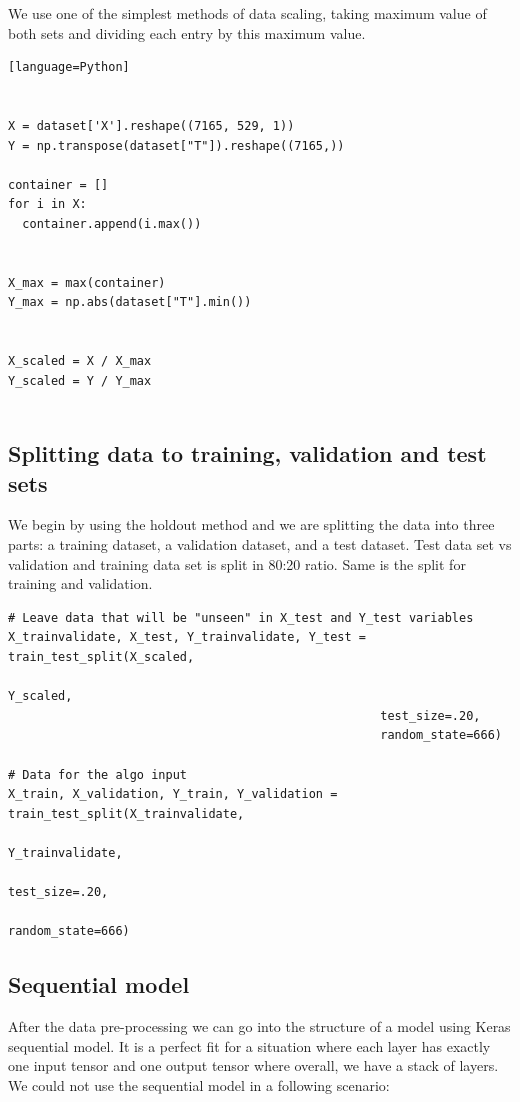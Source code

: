 \documentclass[a4paper,oneside,openright,11pt]{book}
\begin{document}
We use one of the simplest methods of data scaling, taking maximum value of both sets and dividing each entry by this maximum value.

\begin{verbatim}[language=Python]


X = dataset['X'].reshape((7165, 529, 1)) 
Y = np.transpose(dataset["T"]).reshape((7165,))

container = []
for i in X:
  container.append(i.max())
  

X_max = max(container)
Y_max = np.abs(dataset["T"].min())


X_scaled = X / X_max
Y_scaled = Y / Y_max


\end{verbatim}

\subsection{Splitting data to training, validation and test sets}

We begin by using the holdout method and we are splitting the data into three parts: a training dataset, a validation dataset, and a test dataset. Test data set vs validation and training data set is split in 80:20 ratio. Same is the split for training and validation.


\begin{verbatim}
# Leave data that will be "unseen" in X_test and Y_test variables
X_trainvalidate, X_test, Y_trainvalidate, Y_test = train_test_split(X_scaled, 
                                                                    Y_scaled,  
                                                    test_size=.20, 
                                                    random_state=666)

# Data for the algo input
X_train, X_validation, Y_train, Y_validation = train_test_split(X_trainvalidate, 
                                                                Y_trainvalidate,  
                                                                test_size=.20, 
                                                                random_state=666)
\end{verbatim}


\subsection{Sequential model}

After the data pre-processing we can go into the structure of a model using Keras sequential model. It is a perfect fit for a situation where each layer has exactly one input tensor and one output tensor where overall, we have a stack of layers. We could not use the sequential model in a following scenario:
\end{document}
